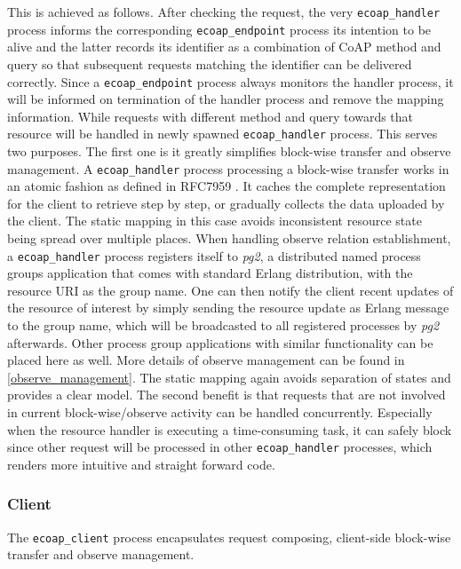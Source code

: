 This is achieved as follows. After checking the request, the very \verb|ecoap_handler| process informs the corresponding \verb|ecoap_endpoint| process its intention to be alive and the latter records its identifier as a combination of CoAP method and query so that subsequent requests matching the identifier can be delivered correctly. Since a \verb|ecoap_endpoint| process always monitors the handler process, it will be informed on termination of the handler process and remove the mapping information. While requests with different method and query towards that resource will be handled in newly spawned \verb|ecoap_handler| process. This serves two purposes. The first one is it greatly simplifies block-wise transfer and observe management. A \verb|ecoap_handler| process processing a block-wise transfer works in an atomic fashion as defined in RFC7959 \cite{blockwise}. It caches the complete representation for the client to retrieve step by step, or gradually collects the data uploaded by the client. The static mapping in this case avoids inconsistent resource state being spread over multiple places. When handling observe relation establishment, a \verb|ecoap_handler| process registers itself to \textit{pg2}, a distributed named process groups application that comes with standard Erlang distribution, with the resource URI as the group name. One can then notify the client recent updates of the resource of interest by simply sending the resource update as Erlang message to the group name, which will be broadcasted to all registered processes by \textit{pg2} afterwards. Other process group applications with similar functionality can be placed here as well. More details of observe management can be found in \ref{observe_management}. The static mapping again avoids separation of states and provides a clear model. The second benefit is that requests that are not involved in current block-wise/observe activity can be handled concurrently. Especially when the resource handler is executing a time-consuming task, it can safely block since other request will be processed in other \verb|ecoap_handler| processes, which renders more intuitive and straight forward code.

\subsubsection{Client}

The \verb|ecoap_client| process encapsulates request composing, client-side block-wise transfer and observe management. 

